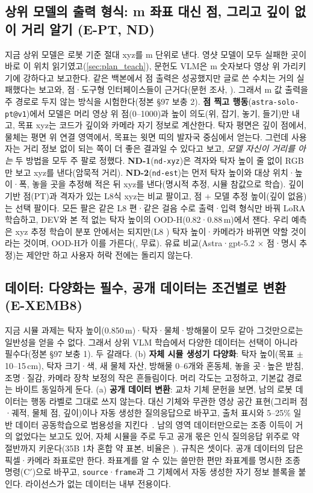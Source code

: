 \subsection{상위 모델의 출력 형식: m 좌표 대신 점, 그리고 깊이 없이 거리 알기 (E-PT, ND)}
\label{sec:plan_pt}
지금 상위 모델은 로봇 기준 절대 xyz를 m 단위로 낸다. 영샷 모델이 모두 실패한 곳이 바로 이 위치 읽기였고(\cref{sec:plan_teach}), 문헌도 VLM은 m 숫자보다 영상 위 가리키기에 강하다고 보고한다. 같은 백본에서 점 출력은 성공했지만 글로 쓴 수치는 거의 실패했다는 보고와, 점·도구형 인터페이스들이 근거다(문헌 조사, ). 그래서 m 값 출력을 주 경로로 두지 않는 방식을 시험한다(정본 §97 보충 2). \textbf{점 찍고 행동}(\texttt{astra-solo-pt@v1})에서 모델은 머리 영상 위 점(0--1000)과 높이 의도(위, 잡기, 놓기, 들기)만 내고, 목표 xyz는 코드가 깊이와 카메라 자기 정보로 계산한다. 탁자 평면은 깊이 점에서, 물체는 평면 위 연결 영역에서, 목표는 윗면 띠의 발자국 중심에서 얻는다. 그런데 사용자는 거리 정보 없이 되는 쪽이 더 좋은 결과일 수 있다고 보고, \emph{모델 자신이 거리를 아는} 두 방법을 모두 주 팔로 정했다. \textbf{ND-1}(\texttt{nd-xyz})은 격자와 탁자 높이 줄 없이 RGB만 보고 xyz를 낸다(암묵적 거리). \textbf{ND-2}(\texttt{nd-est})는 먼저 탁자 높이와 대상 위치·높이·폭, 놓을 곳을 추정해 적은 뒤 xyz를 낸다(명시적 추정, 시뮬 참값으로 학습). 깊이 기반 점(PT)과 격자가 있는 L8식 xyz는 비교 팔이고, 점 + 모델 추정 높이(깊이 없음)는 선택 팔이다. 모든 팔은 같은 L8 편·같은 걸음 수로 출력·입력 형식만 바꿔 LoRA 학습하고, DEV와 본 적 없는 탁자 높이의 OOD-H(0.82·0.88\,m)에서 잰다. 우리 예측은 xyz 추정 학습이 분포 안에서는 되지만(L8 ) 탁자 높이·카메라가 바뀌면 약할 것이라는 것이며, OOD-H가 이를 가른다(, 무료). 유료 비교(Astra·gpt-5.2 $\times$ 점·명시 추정)는 제안만 하고 사용자 허락 전에는 돌리지 않는다.

\subsection{데이터: 다양화는 필수, 공개 데이터는 조건별로 변환 (E-XEMB8)}
\label{sec:plan_data}
지금 시뮬 과제는 탁자 높이(0.850\,m)·탁자·물체·방해물이 모두 같아 그것만으로는 일반성을 얻을 수 없다. 그래서 상위 VLM 학습에서 다양한 데이터는 선택이 아니라 필수다(정본 §97 보충 1). 두 갈래다. (b) \textbf{자체 시뮬 생성기 다양화}: 탁자 높이(목표 $\pm$10--15\,cm), 탁자 크기·색, 새 물체 자산, 방해물 0--6개와 혼동체, 놓을 곳·높은 받침, 조명·질감, 카메라 장착 보정의 작은 흔들림이다. 머리 각도는 고정하고, 기본값 경로는 바이트 동일하게 둔다. (a) \textbf{공개 데이터 변환}: 교차 기체 문헌을 보면, 남의 로봇 데이터는 행동 라벨로 그대로 쓰지 않는다. 대신 기체와 무관한 영상 공간 표현(그리퍼 점·궤적, 물체 점, 깊이)이나 자동 생성한 질의응답으로 바꾸고, 출처 표시와 5--25\% 일반 데이터 공동학습으로 범용성을 지킨다~\cite{molmoact2026}. 남의 영역 데이터만으로는 조종 이득이 거의 없었다는 보고도 있어, 자체 시뮬을 주로 두고 공개 몫은 인식 질의응답 위주로 약 절반까지 키운다(35B 1차 혼합 약  표본, 비율은 ). 규칙은 셋이다. 공개 데이터의 답은 픽셀·카메라 좌표로만 한다. 좌표계를 알 수 있는 쓸만한 편만 좌표계를 명시한 조종 명령(C$'$)으로 바꾸고, \texttt{source}·\texttt{frame}과 그 기체에서 자동 생성한 자기 정보 블록을 붙인다. 라이선스가 없는 데이터는 내부 전용이다.

